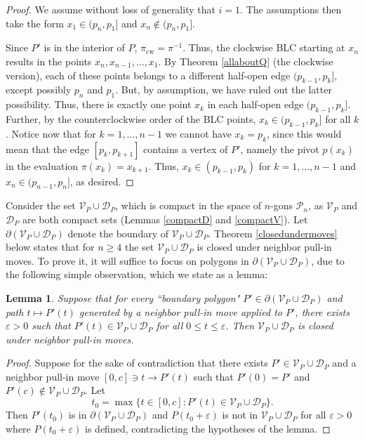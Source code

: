 \documentclass[11pt]{amsart}
\newtheorem{lemma}[theorem]{Lemma}
\theoremstyle{remark}
\numberwithin{equation}{section}
\newcommand{\PP}{\mathcal{P}}
\newcommand{\D}{\mathcal{D}}
\newcommand{\V}{\mathcal{V}}
\newcommand{\cw}{\mathrm{cw}}
\renewcommand{\epsilon}{\varepsilon}
\renewcommand{\leq}{\leqslant}
\renewcommand{\geq}{\geqslant}
\begin{document}
\begin{proof}
We assume without loss of generality that $i=1$.
The assumptions  then take the form $x_1\in (p_n,p_1]$ and $x_n\notin (p_n,p_1]$. 

Since $P'$ is in the interior of $P$, $\pi_{\cw}=\pi^{-1}$. Thus, the clockwise BLC starting at $x_n$ results in the points 
$x_n,x_{n-1},\dots,x_1$. By Theorem \ref{allaboutQ} (the clockwise version), each of these points belongs to a different half-open edge $(p_{k-1},p_{k}]$, except possibly $p_n$ and $p_1$. But, by assumption, we have ruled out the latter possibility. Thus, there is exactly one point $x_k$ in each half-open edge $(p_{k-1},p_{k}]$. Further, by the counterclockwise order of the BLC points,  $x_k\in (p_{k-1},p_{k}]$ for all $k$. Notice now that for $k=1,\ldots,n-1$ we cannot have $x_k=p_k$, since this would mean that the edge  $[p_k,p_{k+1}]$ contains a vertex of $P'$,  namely the pivot $p(x_{k})$ in the evaluation $\pi(x_{k})=x_{k+1}$.
Thus,  $x_k\in (p_{k-1},p_{k})$ for $k=1,\ldots,n-1$ and $x_n\in (p_{n-1},p_n]$, as desired.
\end{proof}



Consider the set $\V_P\cup\D_P$, which is compact in the space of $n$-gons $\PP_n$, as $\V_P$ and $\D_P$ are both compact sets (Lemmas \ref{compactD} and \ref{compactV}).  Let $\partial (\V_P\cup \D_P)$ denote the boundary of $\V_P\cup\D_P$. Theorem \ref{closedundermoves} below states that for $n\geq 4$ the set $\V_P \cup \D_P$ is closed under neighbor pull-in moves. To prove it, it will suffice to focus on polygons in $\partial (\V_P\cup\D_P)$, due to the following simple observation, which we state as a lemma:


\begin{lemma}\label{reducetoboundary}
Suppose that for every ``boundary polygon" $P'\in \partial (\V_P\cup\D_P)$ and path $t\mapsto P'(t)$ generated by a neighbor pull-in move applied to $P'$, there exists $\epsilon>0$ such that $P'(t)\in \V_P\cup \D_P$ for all $0\leq t \leq \epsilon$. Then $\V_P\cup\D_P$ is closed under neighbor pull-in moves.
\end{lemma}

\begin{proof}
Suppose for the sake of contradiction that there exists $P'\in \V_P\cup\D_P$ and a neighbor pull-in move $[0,c]\ni t\to P'(t)$ such that $P'(0)=P'$ and $P'(c)\not\in \V_P\cup \D_P$. 
Let 
\[
t_0=\max \{t\in [0,c]:P'(t)\in \V_P\cup\D_P\}.
\]
Then $P'(t_0)$ is in $\partial(\V_P\cup\D_P)$ and $P(t_0+\epsilon)$ is not in $\V_P\cup\D_P$ for all $\epsilon>0$ where $P(t_0+\epsilon)$ is defined,
contradicting the hypotheses of the lemma. 
\end{proof}
\end{document}

